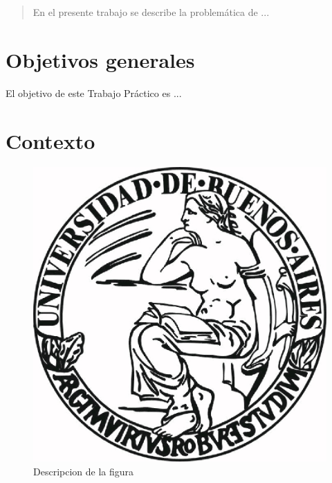\documentclass[a4paper]{article}
\begin{document}
\thispagestyle{empty}

\newpage

\thispagestyle{empty}
\vfill
\begin{abstract}
En el presente trabajo se describe la problemática de ...
\end{abstract}

\thispagestyle{empty}
\vspace{3cm}
\tableofcontents
\newpage


\newpage

\section{Objetivos generales}

El objetivo de este Trabajo Práctico es ...


\section{Contexto}

\begin{figure}
  \begin{center}
	\includegraphics[scale=0.66]{imagenes/logouba.jpg}
	\caption{Descripcion de la figura}
	\label{nombreparareferenciar}
  \end{center}
\end{figure}
\end{document}
